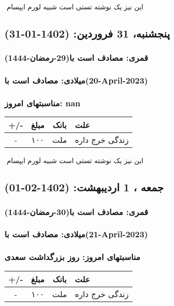 \documentclass{article}
\newcommand{\rnote}[1]{\marginpar{\textcolor{color}{\StrSubstitute{\##1}{ }{\_}}}}
\newcommand{\myRow}[4]{
    #1 & #2 & #3 & #4 \\ \hline
}
\begin{document}
‌
\rnote{تست}
این نیز یک نوشته تستی است شبیه لورم ایپسام




\newpage
{}
\textcolor{color}{
\section{ پنجشنبه، 31 فروردین: (1402-01-31) }
\subsubsection*{قمری: مصادف است با(29-رمضان-1444)} 
\subsubsection*{میلادی: مصادف است با(20-April-2023)}
\subsubsection*{مناسبتهای امروز: nan}
}


\begin{tabular}{ | c | c | c | p{5cm} |}
    \hline
    \myRow{ +/- }{مبلغ}{بانک}{علت}
    \myRow{-}{۱۰۰}{ملت}{زندگی خرج داره}
\end{tabular}
\newline
\newline

‌
\rnote{تست}
این نیز یک نوشته تستی است شبیه لورم ایپسام




\newpage
{}
\textcolor{color}{
\section{ جمعه ، 1 اردیبهشت: (1402-02-01) }
\subsubsection*{قمری: مصادف است با(30-رمضان-1444)} 
\subsubsection*{میلادی: مصادف است با(21-April-2023)}
\subsubsection*{مناسبتهای امروز: روز بزرگداشت سعدی}
}


\begin{tabular}{ | c | c | c | p{5cm} |}
    \hline
    \myRow{ +/- }{مبلغ}{بانک}{علت}
    \myRow{-}{۱۰۰}{ملت}{زندگی خرج داره}
\end{tabular}
\newline
\newline
\end{document}
